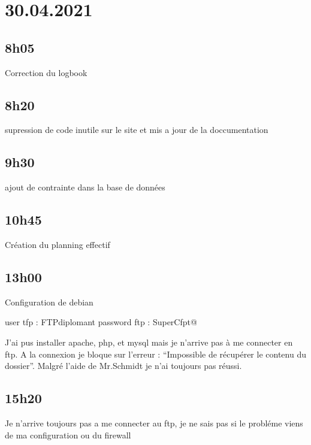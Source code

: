 \documentclass[a4paper,12pt,french]{sphinxmanual}
\begin{document}
\section{30.04.2021}
\label{\detokenize{logbook:id52}}

\subsection{8h05}
\label{\detokenize{logbook:id53}}
\sphinxAtStartPar
Correction du logbook


\subsection{8h20}
\label{\detokenize{logbook:id54}}
\sphinxAtStartPar
supression de code inutile sur le site et mis a jour de la doccumentation


\subsection{9h30}
\label{\detokenize{logbook:id55}}
\sphinxAtStartPar
ajout de contrainte dans la base de données


\subsection{10h45}
\label{\detokenize{logbook:id56}}
\sphinxAtStartPar
Création du planning effectif


\subsection{13h00}
\label{\detokenize{logbook:id57}}
\sphinxAtStartPar
Configuration de debian

\sphinxAtStartPar
user tfp : FTPdiplomant
password ftp : SuperCfpt@

\sphinxAtStartPar
J’ai pus installer apache, php, et mysql mais je n’arrive pas à me connecter en ftp. A la connexion je bloque sur l’erreur : “Impossible de récupérer le contenu du dossier”. Malgré l’aide de Mr.Schmidt je n’ai toujours pas réussi.


\subsection{15h20}
\label{\detokenize{logbook:id58}}
\sphinxAtStartPar
Je n’arrive toujours pas a me connecter au ftp, je ne sais pas si le probléme viens de ma configuration ou du firewall
\end{document}
